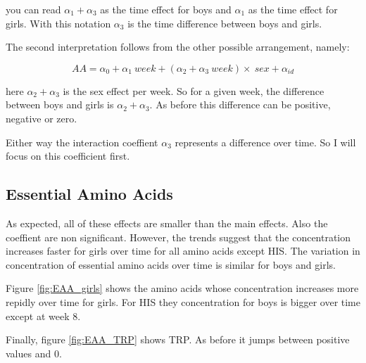 \documentclass[12pt]{article}
\begin{document}
you can read $\alpha_1  + \alpha_3 $ as the time effect for boys and $\alpha_1$ as the time effect for girls. With this notation $\alpha_3$ is the time difference between boys and girls.

The second interpretation follows from the other possible arrangement, namely:

\begin{equation} \label{eq:model3b}
  AA = \alpha_0 + \alpha_1 \ week + \left(\alpha_2  + \alpha_3 \ week \right) \times \ sex  + \alpha_{id}
\end{equation}

here $\alpha_2 + \alpha_3$ is the sex effect per week. So for a given week, the difference between boys and girls is $\alpha_2 + \alpha_3$. As before this difference can be positive, negative or zero.

Either way the interaction coeffient $\alpha_3$ represents a difference over time. So I will focus on this coefficient first.

\subsection{Essential Amino Acids}

As expected, all of these effects are smaller than the main effects. Also the coeffient are non significant. However, the trends suggest that the concentration increases faster for girls over time for all amino acids except HIS. The variation in concentration of essential amino acids over time is similar for boys and girls.

Figure \ref{fig:EAA_girls} shows the amino acids whose concentration increases more repidly over time for girls. For HIS they concentration for boys is bigger over time except at week $8$.

Finally, figure \ref{fig:EAA_TRP} shows TRP. As before it jumps between positive values and $0$.
\end{document}
